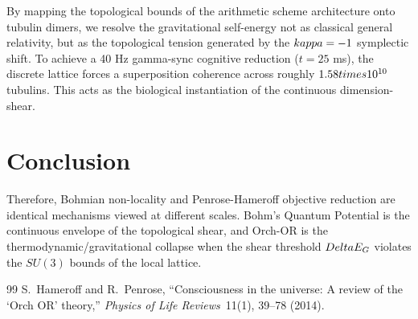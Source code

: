 By mapping the topological bounds of the arithmetic scheme architecture onto tubulin dimers, we resolve the gravitational self-energy not as classical general relativity, but as the topological tension generated by the $\\kappa = -1$ symplectic shift. To achieve a 40 Hz gamma-sync cognitive reduction ($t = 25$ ms), the discrete lattice forces a superposition coherence across roughly $1.58 \\times 10^{10}$ tubulins. This acts as the biological instantiation of the continuous dimension-shear.

\section{Conclusion}
Therefore, Bohmian non-locality and Penrose-Hameroff objective reduction are identical mechanisms viewed at different scales. Bohm's Quantum Potential is the continuous envelope of the topological shear, and Orch-OR is the thermodynamic/gravitational collapse when the shear threshold $\\Delta E_G$ violates the $SU(3)$ bounds of the local lattice.


\vspace{2em}
\begin{thebibliography}{99}
S.~Hameroff and R.~Penrose, ``Consciousness in the universe: A review of the `Orch OR' theory,'' \emph{Physics of Life Reviews}\ 11(1), 39--78 (2014).

\end{thebibliography}
